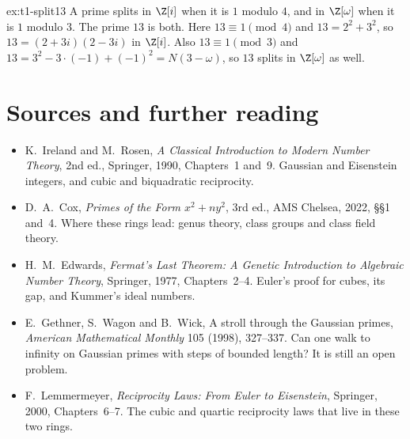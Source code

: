 \begin{solution}{ex:t1-split13}
\idea A prime splits in $\Z[i]$ when it is $1$ modulo $4$, and in $\Z[\omega]$ when it is $1$ modulo $3$. The prime $13$ is both.
\writeup Here $13\equiv 1\pmod 4$ and $13=2^2+3^2$, so $13=(2+3i)(2-3i)$ in $\Z[i]$. Also $13\equiv 1\pmod 3$ and $13=3^2-3\cdot(-1)+(-1)^2=N(3-\omega)$, so $13$ splits in $\Z[\omega]$ as well.
\end{solution}

\section*{Sources and further reading}

\begin{itemize}
\item K.~Ireland and M.~Rosen, \emph{A Classical Introduction to Modern Number Theory}, 2nd ed., Springer, 1990, Chapters~1 and~9. Gaussian and Eisenstein integers, and cubic and biquadratic reciprocity.
\item D.~A.~Cox, \emph{Primes of the Form $x^2+ny^2$}, 3rd ed., AMS Chelsea, 2022, \S\S1 and~4. Where these rings lead: genus theory, class groups and class field theory.
\item H.~M.~Edwards, \emph{Fermat's Last Theorem: A Genetic Introduction to Algebraic Number Theory}, Springer, 1977, Chapters~2--4. Euler's proof for cubes, its gap, and Kummer's ideal numbers.
\item E.~Gethner, S.~Wagon and B.~Wick, A stroll through the Gaussian primes, \emph{American Mathematical Monthly} 105 (1998), 327--337. Can one walk to infinity on Gaussian primes with steps of bounded length? It is still an open problem.
\item F.~Lemmermeyer, \emph{Reciprocity Laws: From Euler to Eisenstein}, Springer, 2000, Chapters~6--7. The cubic and quartic reciprocity laws that live in these two rings.
\end{itemize}
